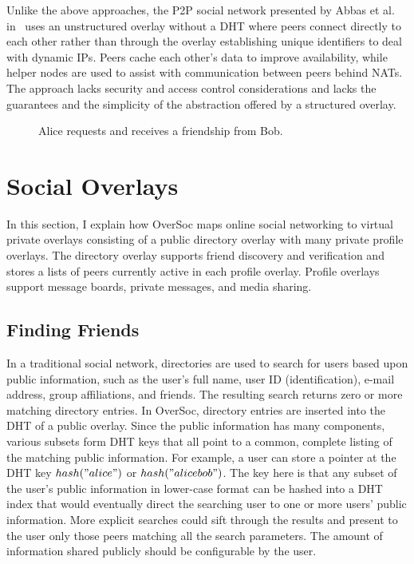 Unlike the above approaches, the P2P social network presented by Abbas et al.
in~\cite{tribler-osn} uses an unstructured overlay without a DHT where peers
connect directly to each other rather than through the overlay establishing
unique identifiers to deal with dynamic IPs.  Peers cache each other's data to
improve availability, while helper nodes are used to assist with communication
between peers behind NATs.  The approach lacks security and access control
considerations and lacks the guarantees and the simplicity of the abstraction
offered by a structured overlay.

\begin{figure}
\centering
{}
\caption{Alice requests and receives a friendship from Bob.}
\label{fig:friend_request}
\end{figure}

\section{Social Overlays}
\label{vpo:social_overlays}

In this section, I explain how OverSoc maps online social networking to virtual
private overlays consisting of a public directory overlay with many private
profile overlays.  The directory overlay supports friend discovery and
verification and stores a lists of peers currently active in each profile
overlay.  Profile overlays support message boards, private messages, and media
sharing.

\subsection{Finding Friends}

In a traditional social network, directories are used to search for users based
upon public information, such as the user's full name, user ID
(identification), e-mail address, group affiliations, and friends.  The
resulting search returns zero or more matching directory entries.  In OverSoc,
directory entries are inserted into the DHT of a public overlay.  Since the
public information has many components, various subsets form DHT keys that all
point to a common, complete listing of the matching public information.  For
example, a user can store a pointer at the DHT key $hash("alice")$ or
$hash("alice bob")$.  The key here is that any subset of the user's public
information in lower-case format can be hashed into a DHT index that would
eventually direct the searching user to one or more users' public information.
More explicit searches could sift through the results and present to the user
only those peers matching all the search parameters.  The amount of information
shared publicly should be configurable by the user.

